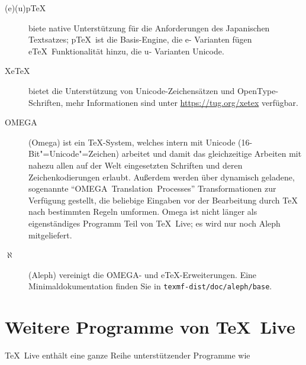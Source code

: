 \documentclass[12pt,ngerman,a4paper,fullparskip]{report}
\newcommand{\TL}{\TeX\ Live\xspace}
\newcommand{\OnCD}[1]{\texttt{#1}}
\providecommand*{\eTeX}{e\TeX\xspace}
\begin{document}
\begin{description}
\item [(e)(u)p\TeX] biete native Unterstützung für die Anforderungen des Japanischen Textsatzes; p\TeX\ ist die Basis-Engine, die e- Varianten fügen \eTeX\ Funktionalität hinzu, die u- Varianten Unicode.


\item [XeTeX] bietet die Unterstützung von Unicode-Zeichensätzen und Open\-Type-Schriften, mehr Informationen sind unter \url{https://tug.org/xetex} verfügbar.

\item [OMEGA] (Omega) ist ein \TeX-System, welches intern mit Unicode (16-Bit"=Unicode"=Zeichen) arbeitet und damit das gleichzeitige Arbeiten mit nahezu allen auf der Welt eingesetzten Schriften
      und deren Zeichenkodierungen erlaubt. Außerdem werden über dynamisch
      geladene, sogenannte \enquote{OMEGA~Translation~Processes} Transformationen zur Verfügung gestellt, die beliebige Eingaben vor der Bearbeitung durch {\TeX} nach bestimmten Regeln
      umformen. Omega ist nicht länger als eigenständiges Programm Teil von \TL; es wird nur noch Aleph mitgeliefert.

\item [$\aleph$] (Aleph) vereinigt die OMEGA- und \eTeX-Erweiterungen.  Eine Minimaldokumentation finden Sie in \OnCD{texmf-dist/doc/aleph/base}.
\end{description}

\section{Weitere Programme von \TL}

\TL enthält eine ganze Reihe unterstützender Programme wie
\end{document}
